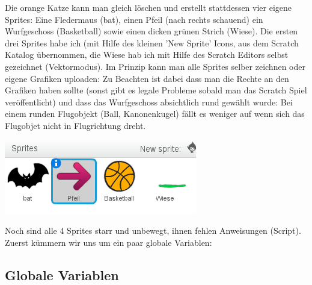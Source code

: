 \documentclass[10pt,a4paper,ngerman,twoside]{article} %
\begin{document}
\begin{multicols}{3}
Die orange Katze kann man gleich löschen und erstellt stattdessen vier eigene Sprites: Eine Fledermaus (bat), einen Pfeil (nach rechts schauend) ein Wurfgeschoss (Basketball) sowie einen dicken grünen Strich (Wiese). Die ersten drei Sprites habe ich (mit Hilfe des kleinen 'New Sprite' Icons, aus dem Scratch Katalog übernommen, die Wiese hab ich mit Hilfe des Scratch Editors selbst gezeichnet (Vektormodus). Im Prinzip kann man alle Sprites selber zeichnen oder eigene Grafiken uploaden: Zu Beachten ist dabei dass man die Rechte an den Grafiken haben sollte (sonst gibt es legale Probleme sobald man das Scratch Spiel veröffentlicht) und dass das Wurfgeschoss absichtlich rund gewählt wurde: Bei einem runden Flugobjekt (Ball, Kanonenkugel) fällt es weniger auf wenn sich das Flugobjet nicht in Flugrichtung dreht.

\begin{center}
\includegraphics[width=\linewidth]{scratch/fsprites.png}
\end{center}

Noch sind alle 4 Sprites starr und unbewegt, ihnen fehlen Anweisungen (Script). Zuerst kümmern wir uns um ein paar globale Variablen:
\newpage
\subsection*{Globale Variablen}


\end{multicols}
\end{document}
